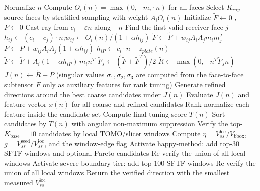 \documentclass[11pt,a4paper]{article}
\begin{document}
\begin{algorithm}[H]
\caption{SFTF Candidate Generation, Local Verification, and Happy-Method Escalation}
\begin{algorithmic}[1]
    \State Normalize $n$
    \State Compute $O_i(n)=\max(0,-m_i\cdot n)$ for all faces
    \State Select $K_{ray}$ source faces by stratified sampling with weight $A_iO_i(n)$
    \State Initialize $\tilde F\gets 0$ , $P\gets 0$
        \State Cast ray from $c_i-\varepsilon n$ along $-n$
        \State Find the first valid receiver face $j$
            \State $h_{ij}\gets(c_i-c_j)\cdot n$;\quad $w_{ij}\gets O_i(n)/(1+\alpha h_{ij})$
            \State $\tilde F\gets \tilde F+w_{ij}A_iA_jm_im_j^T$ 
            \State $P\gets P+w_{ij}A_iA_j(1+\alpha h_{ij})$
        \Else
            \State $h_{iP}\gets c_i\cdot n-z_{plate}(n)$
            \State $\tilde F\gets \tilde F+A_i(1+\alpha h_{iP})\,m_in^T$ 
        \EndIf
    \EndFor
    \State $\tilde F_s\gets(\tilde F+\tilde F^T)/2$
    \State $\tilde R\gets\max(0,-n^T\tilde F_sn)$ 
    \State $J(n)\gets \tilde R+P$
    \State (singular values $\sigma_1,\sigma_2,\sigma_3$ are computed from the face-to-face subtensor $F$ only as auxiliary features for rank tuning)
\EndFor
\State Generate refined directions around the best coarse candidates under $J(n)$
\State Evaluate $J(n)$ and feature vector $x(n)$ for all coarse and refined candidates
\State Rank-normalize each feature inside the candidate set
\State Compute final tuning score $T(n)$
\State Sort candidates by $T(n)$ with angular non-maximum suppression
\State Verify the top-$K_{\mathrm{base}}=10$ candidates by local TOMO/slicer windows
\State Compute $\eta=V_{ss}^{\mathrm{loc}}/V_{\mathrm{bbox}}$, $g=V_{ss}^{\mathrm{seed}}/V_{ss}^{\mathrm{loc}}$, and the window-edge flag
    \State Activate happy-method: add top-$30$ SFTF windows and optional Pareto candidates
    \State Re-verify the union of all local windows
    \State Activate severe-boundary tier: add top-$100$ SFTF windows
    \State Re-verify the union of all local windows
\EndIf
\State Return the verified direction with the smallest measured $V_{ss}^{\mathrm{loc}}$
\end{algorithmic}
\end{algorithm}
\end{document}
